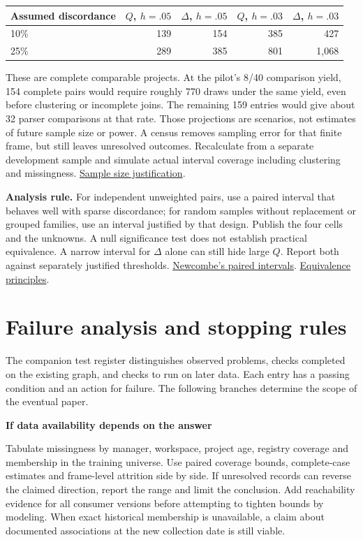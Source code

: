 \documentclass[11pt,a4paper]{article}
\newcommand{\pg}[1]{\newpage\section{\color{ink}#1}}
\newcommand{\hd}[1]{\par\textbf{\color{accent}#1}\par\nopagebreak}
\newcommand{\doi}[2]{\href{https://doi.org/#1}{#2}}
\begin{document}
\begin{center}\small\begin{tabular}{lrrrr}\toprule
Assumed discordance & $Q$, $h=.05$ & $\Delta$, $h=.05$ & $Q$, $h=.03$ & $\Delta$, $h=.03$\\\midrule
10\% &139&154&385&427\\
25\% &289&385&801&1,068\\\bottomrule\end{tabular}\end{center}
These are complete comparable projects. At the pilot's 8/40 comparison yield, 154 complete pairs would require roughly 770 draws under the same yield, even before clustering or incomplete joins. The remaining 159 entries would give about 32 parser comparisons at that rate. Those projections are scenarios, not estimates of future sample size or power. A census removes sampling error for that finite frame, but still leaves unresolved outcomes. Recalculate from a separate development sample and simulate actual interval coverage including clustering and missingness. \href{https://online.ucpress.edu/collabra/article/8/1/33267/120491/Sample-Size-Justification}{Sample size justification}.

\textbf{Analysis rule.} For independent unweighted pairs, use a paired interval that behaves well with sparse discordance; for random samples without replacement or grouped families, use an interval justified by that design. Publish the four cells and the unknowns. A null significance test does not establish practical equivalence. A narrow interval for $\Delta$ alone can still hide large $Q$. Report both against separately justified thresholds. \href{https://www.eiti.uottawa.ca/~nat/Courses/csi5388/Newcombe.1998.pdf}{Newcombe's paired intervals}. \doi{10.1177/1948550617697177}{Equivalence principles}.

\pg{Failure analysis and stopping rules}
The companion test register distinguishes observed problems, checks completed on the existing graph, and checks to run on later data. Each entry has a passing condition and an action for failure. The following branches determine the scope of the eventual paper.

\hd{If data availability depends on the answer}
Tabulate missingness by manager, workspace, project age, registry coverage and membership in the training universe. Use paired coverage bounds, complete-case estimates and frame-level attrition side by side. If unresolved records can reverse the claimed direction, report the range and limit the conclusion. Add reachability evidence for all consumer versions before attempting to tighten bounds by modeling. When exact historical membership is unavailable, a claim about documented associations at the new collection date is still viable.
\end{document}
